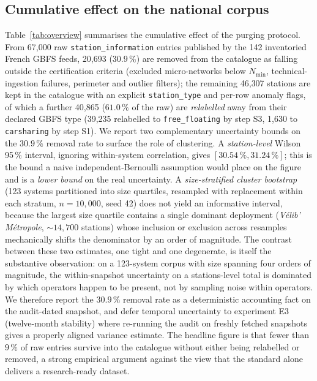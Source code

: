 \documentclass[11pt,a4paper]{article}
\begin{document}
\subsection{Cumulative effect on the national corpus}
Table~\ref{tab:overview} summarises the cumulative effect of the
purging protocol. From 67{,}000 raw \texttt{station\_information}
entries published by the 142 inventoried French GBFS feeds,
20{,}693 ($30.9\,\%$) are removed from the catalogue as falling
outside the certification criteria (excluded micro-networks below
$N_{\min}$, technical-ingestion failures, perimeter and outlier
filters); the remaining 46{,}307 stations are kept in the catalogue
with an explicit \texttt{station\_type} and per-row anomaly flags,
of which a further 40{,}865 ($61.0\,\%$ of the raw) are
\emph{relabelled} away from their declared GBFS type (39{,}235
relabelled to \texttt{free\_floating} by step S3, 1{,}630 to
\texttt{carsharing} by step S1). We report two complementary uncertainty bounds on the
$30.9\,\%$ removal rate to surface the role of clustering. A
\emph{station-level} Wilson 95\,\% interval, ignoring within-system
correlation, gives $[30.54\,\%, 31.24\,\%]$; this is the bound a
naive independent-Bernoulli assumption would place on the figure
and is a \emph{lower bound} on the real uncertainty. A
\emph{size-stratified cluster bootstrap} (123 systems partitioned
into size quartiles, resampled with replacement within each
stratum, $n = 10{,}000$, seed 42) does not yield an informative
interval, because
the largest size quartile contains a single dominant deployment
(\emph{V\'elib' M\'etropole}, $\sim 14{,}700$ stations) whose
inclusion or exclusion across resamples mechanically shifts the
denominator by an order of magnitude. The contrast between these two
estimates, one tight and one degenerate, is itself the
substantive observation: on a 123-system corpus with size
spanning four orders of magnitude, the within-snapshot
uncertainty on a stations-level total is dominated by which
operators happen to be present, not by sampling noise within
operators. We therefore report the $30.9\,\%$ removal rate as a
deterministic accounting fact on the audit-dated snapshot, and
defer temporal uncertainty to experiment E3 (twelve-month
stability) where re-running the audit on freshly fetched
snapshots gives a properly aligned variance estimate. The
headline figure is that fewer than $9\,\%$ of raw entries
survive into the catalogue without either being relabelled or
removed, a strong empirical argument against the view that the
standard alone delivers a research-ready dataset.
\end{document}
